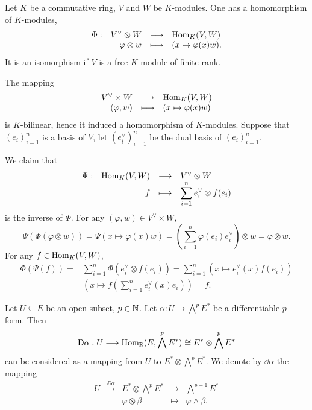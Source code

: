 \begin{propositionenv}
    Let $K$ be a commutative ring, $V$ and $W$ be $K$-modules.
    One has a homomorphism of $K$-modules,
    $$\begin{array}{rrcl}
        \Phi: & V^\vee \otimes W & \longrightarrow & \operatorname{\mathrm{Hom}}_K (V,W)\\
        & \varphi \otimes w & \longmapsto & (x \mapsto \varphi(x) w).
    \end{array}$$
    It is an isomorphism if $V$ is a free $K$-module of finite rank.
\end{propositionenv}
\begin{proofenv}
    The mapping
    $$\begin{array}{rcl}
        V^\vee \times W & \longrightarrow & \operatorname{\mathrm{Hom}}_K (V,W)\\
        (\varphi,w) & \longmapsto & (x \mapsto \varphi(x) w)
    \end{array}$$
    is $K$-bilinear, hence it induced a homomorphism of $K$-modules.
    Suppose that $(e_i)_{i=1}^n$ is a basis of $V$, let $(e_i^\vee)_{i=1}^n$ be the dual basis of $(e_i)_{i=1}^n$.

    We claim that
    $$\begin{array}{rrcl}
        \Psi: & \operatorname{\mathrm{Hom}}_{K}(V,W) & \longrightarrow & V^\vee \otimes W\\
        & f & \longmapsto & \displaystyle \sum_{i=1}^n e_i^\vee \otimes f(e_i)
    \end{array}$$
    is the inverse of $\Phi$.
    For any $(\varphi,w) \in V^\vee \times W$,
    $$\Psi(\Phi(\varphi \otimes w)) = \Psi (x \mapsto \varphi(x) w) = (\sum_{i=1}^n \varphi(e_i) e_i^\vee) \otimes w = \varphi \otimes w.$$
    For any $f \in \operatorname{\mathrm{Hom}}_{K}(V,W)$,
    $$\begin{aligned}
        \Phi(\Psi(f)) = & \sum_{i=1}^{n} \Phi(e_{i}^\vee \otimes f(e_i)) = \sum_{i=1}^{n}(x \mapsto e_i^\vee (x)f(e_i))\\
        = & \left(x \mapsto f\left(\sum_{i=1}^{n}e_i^\vee (x)e_i\right)\right) = f.
    \end{aligned}$$
\end{proofenv}

\begin{definitionenv}
    Let $U \subseteq E$ be an open subset, $p \in \mathbb{N}$.
    Let $\alpha : U \rightarrow \bigwedge^p E^*$ be a differentiable $p$-form.
    Then
    $$\mathrm{D} \alpha : U \longrightarrow \operatorname{\mathrm{Hom}}_{\mathbb{R}} (E,\bigwedge^p E^*) \cong E^* \otimes \bigwedge^p E^*$$
    can be considered as a mapping from $U$ to $E^* \otimes \bigwedge^p E^*$.
    We denote by $\dd \alpha$ the mapping
    $$\begin{array}{rcccl}
        U & \overset{\DD \alpha}{\longrightarrow} & E^* \otimes \bigwedge^p E^* & \longrightarrow & \bigwedge^{p+1} E^*\\
        & & \varphi \otimes \beta & \longmapsto & \varphi \wedge \beta.
    \end{array}$$
\end{definitionenv}

